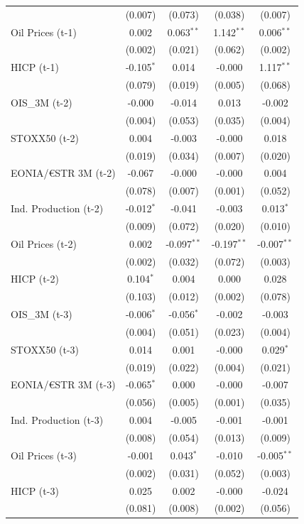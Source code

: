\begin{longtable}[t]{lcccc}
 & (0.007) & (0.073) & (0.038) & (0.007)\\
Oil Prices (t-1) & 0.002 & 0.063$^{**}$ & 1.142$^{**}$ & 0.006$^{**}$\\
 & (0.002) & (0.021) & (0.062) & (0.002)\\
HICP (t-1) & -0.105$^{*}$ & 0.014 & -0.000 & 1.117$^{**}$\\
 & (0.079) & (0.019) & (0.005) & (0.068)\\
OIS\_3M (t-2) & -0.000 & -0.014 & 0.013 & -0.002\\
 & (0.004) & (0.053) & (0.035) & (0.004)\\
STOXX50 (t-2) & 0.004 & -0.003 & -0.000 & 0.018\\
 & (0.019) & (0.034) & (0.007) & (0.020)\\
EONIA/€STR 3M (t-2) & -0.067 & -0.000 & -0.000 & 0.004\\
 & (0.078) & (0.007) & (0.001) & (0.052)\\
Ind. Production (t-2) & -0.012$^{*}$ & -0.041 & -0.003 & 0.013$^{*}$\\
 & (0.009) & (0.072) & (0.020) & (0.010)\\
Oil Prices (t-2) & 0.002 & -0.097$^{**}$ & -0.197$^{**}$ & -0.007$^{**}$\\
 & (0.002) & (0.032) & (0.072) & (0.003)\\
HICP (t-2) & 0.104$^{*}$ & 0.004 & 0.000 & 0.028\\
 & (0.103) & (0.012) & (0.002) & (0.078)\\
OIS\_3M (t-3) & -0.006$^{*}$ & -0.056$^{*}$ & -0.002 & -0.003\\
 & (0.004) & (0.051) & (0.023) & (0.004)\\
STOXX50 (t-3) & 0.014 & 0.001 & -0.000 & 0.029$^{*}$\\
 & (0.019) & (0.022) & (0.004) & (0.021)\\
EONIA/€STR 3M (t-3) & -0.065$^{*}$ & 0.000 & -0.000 & -0.007\\
 & (0.056) & (0.005) & (0.001) & (0.035)\\
Ind. Production (t-3) & 0.004 & -0.005 & -0.001 & -0.001\\
 & (0.008) & (0.054) & (0.013) & (0.009)\\
Oil Prices (t-3) & -0.001 & 0.043$^{*}$ & -0.010 & -0.005$^{**}$\\
 & (0.002) & (0.031) & (0.052) & (0.003)\\
HICP (t-3) & 0.025 & 0.002 & -0.000 & -0.024\\
 & (0.081) & (0.008) & (0.002) & (0.056)\\

\end{longtable}
